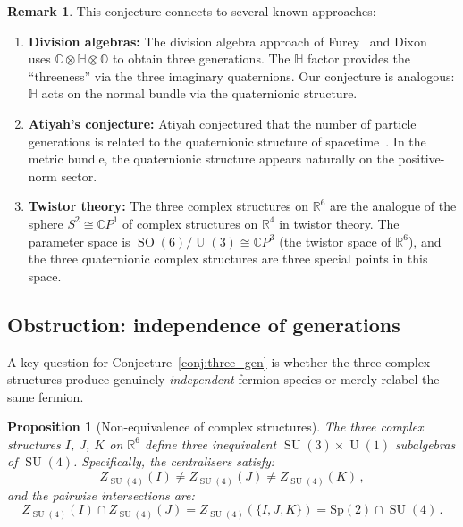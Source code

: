\documentclass[12pt,a4paper]{article}
\newtheorem{proposition}[theorem]{Proposition}
\theoremstyle{definition}
\newtheorem{remark}[theorem]{Remark}
\newcommand{\SO}{\operatorname{SO}}
\newcommand{\SU}{\operatorname{SU}}
\newcommand{\U}{\operatorname{U}}
\newcommand{\R}{\mathbb{R}}
\newcommand{\C}{\mathbb{C}}
\newcommand{\HH}{\mathbb{H}}
\begin{document}
\begin{remark}
This conjecture connects to several known approaches:
\begin{enumerate}[nosep]
\item \textbf{Division algebras:} The division algebra approach of Furey~\cite{Furey2016} and Dixon~\cite{Dixon1994} uses $\C \otimes \HH \otimes \mathbb{O}$ to obtain three generations.
The $\HH$ factor provides the ``threeness'' via the three imaginary quaternions.
Our conjecture is analogous: $\HH$ acts on the normal bundle via the quaternionic structure.

\item \textbf{Atiyah's conjecture:} Atiyah conjectured that the number of particle generations is related to the quaternionic structure of spacetime~\cite{Atiyah2016}.
In the metric bundle, the quaternionic structure appears naturally on the positive-norm sector.

\item \textbf{Twistor theory:} The three complex structures on $\R^6$ are the analogue of the sphere $S^2 \cong \C P^1$ of complex structures on $\R^4$ in twistor theory.
The parameter space is $\SO(6)/\U(3) \cong \C P^3$ (the twistor space of $\R^6$), and the three quaternionic complex structures are three special points in this space.
\end{enumerate}
\end{remark}

\subsection{Obstruction: independence of generations}

A key question for Conjecture~\ref{conj:three_gen} is whether the three complex structures produce genuinely \emph{independent} fermion species or merely relabel the same fermion.

\begin{proposition}[Non-equivalence of complex structures]
\label{prop:non_equiv}
The three complex structures $I$, $J$, $K$ on $\R^6$ define three \emph{inequivalent} $\SU(3) \times \U(1)$ subalgebras of $\SU(4)$.
Specifically, the centralisers satisfy:
\begin{equation}
Z_{\SU(4)}(I) \neq Z_{\SU(4)}(J) \neq Z_{\SU(4)}(K)\,,
\end{equation}
and the pairwise intersections are:
\begin{equation}
Z_{\SU(4)}(I) \cap Z_{\SU(4)}(J) = Z_{\SU(4)}(\{I,J,K\}) = \mathrm{Sp}(2) \cap \SU(4)\,.
\end{equation}
\end{proposition}
\end{document}
